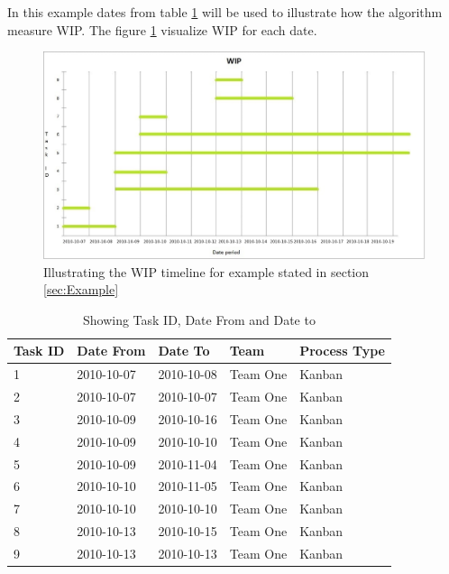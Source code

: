 \documentclass[UKenglish]{ifimaster}  %
\begin{document}
In this example dates from table \ref{wt:2}  will be used to illustrate how the algorithm measure WIP.  The figure \ref{wip_timeline} visualize WIP for each date.
\begin{figure}[ht!]
\centering
\hspace*{-1in}
\includegraphics[width=21cm,trim=4 8 8 4,clip]{Picture/wip_example.jpg}
\caption{Illustrating the WIP timeline for example stated in section \ref{sec:Example}}
\label{wip_timeline}
\end{figure}

\newpage
\begin{table}[!ht]
\begin{center}
    \begin{tabular}{| l | l | p{2cm} | l | l |}
    \hline
   Task ID &   Date From  & Date To & Team & Process Type\\ \hline
     1 & 2010-10-07 & 2010-10-08 & Team One & Kanban  \\ \hline
     2 & 2010-10-07 & 2010-10-07 & Team One & Kanban   \\ \hline
     3 & 2010-10-09 & 2010-10-16 & Team One & Kanban   \\ \hline
     4 & 2010-10-09 & 2010-10-10 & Team One & Kanban   \\ \hline
     5 & 2010-10-09 & 2010-11-04 & Team One & Kanban   \\ \hline
     6 & 2010-10-10 & 2010-11-05 & Team One & Kanban  \\ \hline
     7 & 2010-10-10 & 2010-10-10 & Team One & Kanban   \\ \hline
     8 & 2010-10-13 & 2010-10-15 & Team One & Kanban  \\ \hline
     9 & 2010-10-13 & 2010-10-13  & Team One  & Kanban   \\ \hline
    \end{tabular}
\caption{Showing Task ID, Date From and Date to}
\label{wt:2} %
\end{center}
\end{table}
\end{document}
